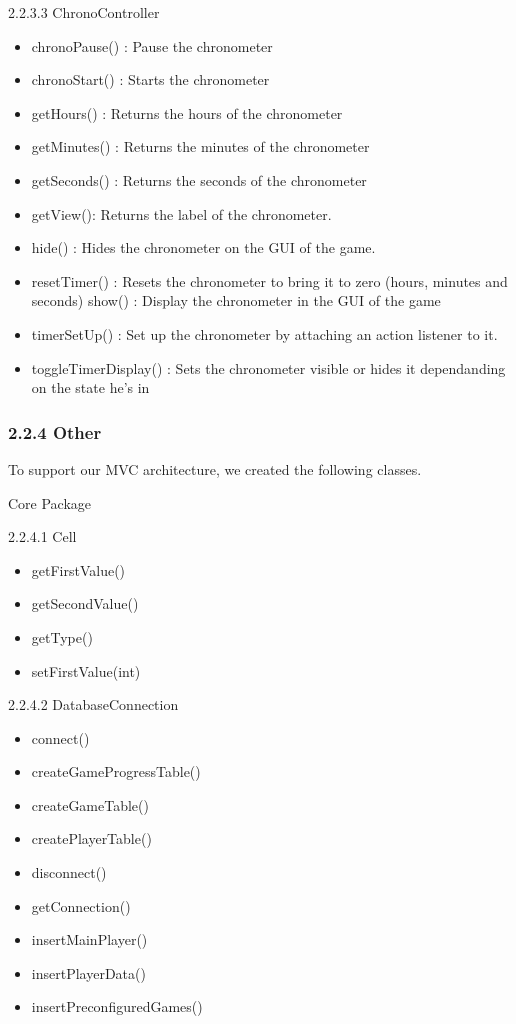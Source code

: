 \documentclass[12pt]{article}
\begin{document}
2.2.3.3 ChronoController\newline
\begin{itemize}
\item chronoPause() : Pause the chronometer
\item chronoStart() : Starts the chronometer
\item getHours() : Returns the hours of the chronometer
\item getMinutes() : Returns the minutes of the chronometer
\item getSeconds() : Returns the seconds of the chronometer
\item getView():  Returns the label of the chronometer.
\item hide() : Hides the chronometer on the GUI of the game.
\item resetTimer() : Resets the chronometer to bring it to zero (hours, minutes and seconds)
show() : Display the chronometer in the GUI of the game
\item timerSetUp() : Set up the chronometer by attaching an action listener to it.
\item toggleTimerDisplay() : Sets the chronometer visible or hides it dependanding on the state he’s in\newline
\end{itemize}

\subsubsection{2.2.4 Other}

To support our MVC architecture, we created the following classes. \newline

Core Package \newline

2.2.4.1 Cell \newline
\begin{itemize}
\item getFirstValue()
\item getSecondValue()
\item getType()
\item setFirstValue(int) \newline
\end{itemize}

2.2.4.2 DatabaseConnection \newline
\begin{itemize}
\item connect()
\item createGameProgressTable()
\item createGameTable()
\item createPlayerTable()
\item  disconnect()
\item  getConnection()
\item  insertMainPlayer()
\item  insertPlayerData()
\item  insertPreconfiguredGames() \newline
\end{itemize}
\end{document}
